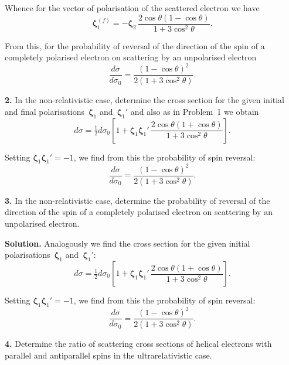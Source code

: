 Whence for the vector of polarisation of the scattered electron we have
\[
\boldsymbol{\zeta}_1^{(f)} = -\boldsymbol{\zeta}_2\,\frac{2\cos\theta(1-\cos\theta)}{1+3\cos^2\theta}.
\]

From this, for the probability of reversal of the direction of the spin of a completely polarised electron on scattering by an unpolarised electron
\[
\frac{d\sigma}{d\sigma_0} = \frac{(1-\cos\theta)^2}{2(1+3\cos^2\theta)}.
\]

\textbf{2.} In the non-relativistic case, determine the cross section for the given initial and final polarisations~$\boldsymbol{\zeta}_1$ and~$\boldsymbol{\zeta}_1'$ and also as in Problem~1 we obtain
\[
d\sigma = \tfrac{1}{2} d\sigma_0\left[1 + \boldsymbol{\zeta}_1\boldsymbol{\zeta}_1'\,\frac{2\cos\theta(1+\cos\theta)}{1+3\cos^2\theta}\right].
\]

Setting $\boldsymbol{\zeta}_1\boldsymbol{\zeta}_1' = -1$, we find from this the probability of spin reversal:
\[
\frac{d\sigma}{d\sigma_0} = \frac{(1-\cos\theta)^2}{2(1+3\cos^2\theta)}.
\]

\textbf{3.} In the non-relativistic case, determine the probability of reversal of the direction of the spin of a completely polarised electron on scattering by an unpolarised electron.

\textbf{Solution.} Analogously we find the cross section for the given initial polarisations~$\boldsymbol{\zeta}_1$ and~$\boldsymbol{\zeta}_1'$:
\[
d\sigma = \tfrac{1}{2} d\sigma_0\left[1 + \boldsymbol{\zeta}_1\boldsymbol{\zeta}_1'\,\frac{2\cos\theta(1+\cos\theta)}{1+3\cos^2\theta}\right].
\]

Setting $\boldsymbol{\zeta}_1\boldsymbol{\zeta}_1' = -1$, we find from this the probability of spin reversal:
\[
\frac{d\sigma}{d\sigma_0} = \frac{(1-\cos\theta)^2}{2(1+3\cos^2\theta)}.
\]

\textbf{4.} Determine the ratio of scattering cross sections of helical electrons with parallel and antiparallel spins in the ultrarelativistic case.

